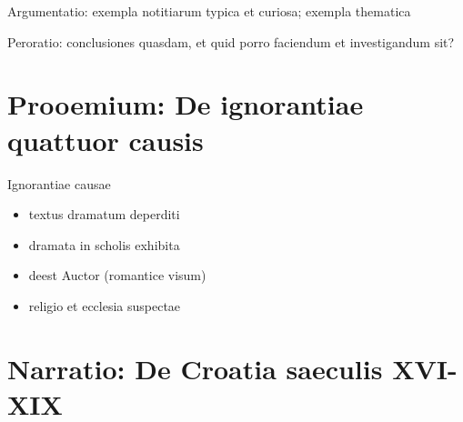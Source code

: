 \documentclass[14pt]{beamer}
\begin{document}
\begin{frame}
  Argumentatio: exempla notitiarum typica et curiosa; exempla thematica
  
\end{frame}

\begin{frame}
  Peroratio: conclusiones quasdam, et quid porro faciendum et investigandum sit?
  
\end{frame}

\section{Prooemium: De ignorantiae quattuor causis}

\begin{frame}{Ignorantiae causae}
  \begin{itemize}
  \item textus dramatum deperditi
  \item dramata in scholis exhibita
  \item deest Auctor (romantice visum)
  \item religio et ecclesia suspectae
  \end{itemize}
  
\end{frame}

\begin{frame}[standout]
    \end{frame}

\section{Narratio: De Croatia saeculis XVI-XIX}

{
    \begin{frame}[plain]
    \end{frame}
    }
\end{document}
